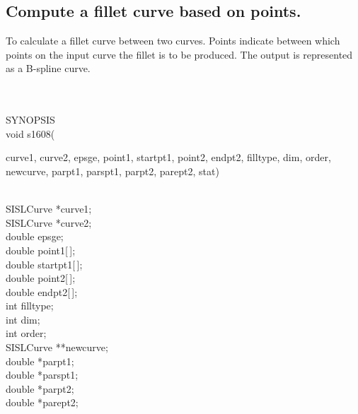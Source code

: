 \subsection{Compute a fillet curve based on points.}
\begin{minipg1}
  To calculate a fillet curve between two curves. Points indicate
  between which points on the input curve the fillet is to be produced.
  The output is represented as a B-spline curve.
\end{minipg1} \\ \\
SYNOPSIS\\
        \>void s1608(\begin{minipg3}
        {\fov curve1}, {\fov curve2}, {\fov epsge}, {\fov point1}, {\fov startpt1}, {\fov point2}, {\fov endpt2},
        {\fov filltype}, {\fov dim}, {\fov order}, {\fov newcurve}, {\fov parpt1}, {\fov parspt1}, {\fov parpt2},
        {\fov parept2}, {\fov stat})
                \end{minipg3}\\[0.3ex]
                \>\>    SISLCurve       \>      *{\fov curve1};\\
                \>\>    SISLCurve       \>      *{\fov curve2}; \\
                \>\>    double  \>      {\fov epsge};\\
                \>\>    double  \>      {\fov point1}[\,];\\
                \>\>    double  \>      {\fov startpt1}[\,];\\
                \>\>    double  \>      {\fov point2}[\,];\\
                \>\>    double  \>      {\fov endpt2}[\,];\\
                \>\>    int     \>      {\fov filltype};\\
                \>\>    int     \>      {\fov dim};\\
                \>\>    int     \>      {\fov order};\\
                \>\>    SISLCurve       \>      **{\fov newcurve};\\
                \>\>    double  \>      *{\fov parpt1};\\
                \>\>    double  \>      *{\fov parspt1};\\
                \>\>    double  \>      *{\fov parpt2};\\
                \>\>    double  \>      *{\fov parept2};\\
